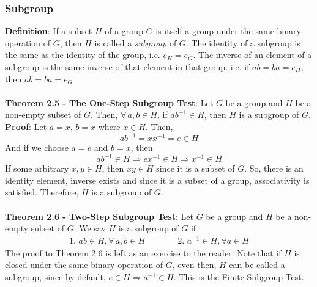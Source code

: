 \documentclass[a4paper, 12pt]{article}
\numberwithin{equation}{section}
\begin{document}
\subsubsection{Subgroup}
\textbf{Definition}: If a subset $H$ of a group $G$ is itself a group under the same binary operation of $G$, then $H$ is called a \textit{subgroup} of $G$. The identity of a subgroup is the same as the identity of the group, i.e. $e_H = e_G$. The inverse of an element of a subgroup is the same inverse of that element in that group. i.e. if $ab = ba = e_H$, then $ab = ba = e_G$\\\\
\textbf{Theorem 2.5 - The One-Step Subgroup Test}: Let $G$ be a group and $H$ be a non-empty subset of $G$. Then, $\forall \,a,b \in H$, if $ab^{-1} \in H$, then $H$ is a subgroup of $G$.\\
\textbf{Proof}: Let $a = x, \,b = x$ where $x \in H$. Then, $$ab^{-1} = xx^{-1} = e \in H$$
And if we choose $a = e$ and $b = x$, then
$$ab^{-1} \in H \Rightarrow ex^{-1} \in H \Rightarrow x^{-1} \in H$$
If some arbitrary $x, y \in H$, then $xy \in H$ since it is a subset of $G$. So, there is an identity element, inverse exists and since it is a subset of a group, associativity is satisfied. Therefore, $H$ is a subgroup of $G$.\\\\
\textbf{Theorem 2.6 - Two-Step Subgroup Test}: Let $G$ be a group and $H$ be a non-empty subset of $G$. We say $H$ is a subgroup of $G$ if 
\begin{align}
\text{1. $ab \in H, \forall \,a,b \in H$} \quad &\quad \quad \text{2. $a^{-1} \in H, \forall a \in H$}
\end{align}
The proof to Theorem 2.6 is left as an exercise to the reader. Note that if $H$ is closed under the same binary operation of $G$, even then, $H$ can be called a subgroup, since by default, $e \in H \Rightarrow a^{-1} \in H$. This is the Finite Subgroup Test.\\
\end{document}
